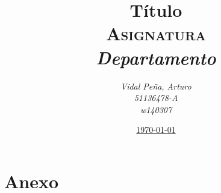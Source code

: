 \documentclass[12pt, a4paper, spanish]{article}
\title{\textbf{Título} \\
	\textsc{Asignatura} \\
	\emph{Departamento}}
\author{\emph{Vidal Peña, Arturo} \\
        \emph{51136478-A} \\
        \emph{w140307}}
\date{\underline{\today}}
\begin{document}
	
	\maketitle
	\thispagestyle{empty}
	\renewcommand*\contentsname{Índice de contenidos}
	\tableofcontents
	\pagebreak
    
    \section{}

	\newpage
	\section{Anexo}
\end{document}
